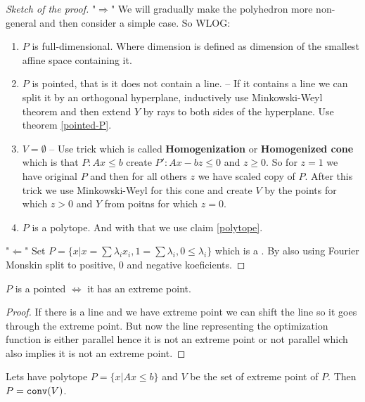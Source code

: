 \begin{proof}[Sketch of the proof]
	"$\Rightarrow$" We will gradually make the polyhedron more non-general and then consider a simple case. So WLOG:

	\begin{enumerate}
		\item $P$ is full-dimensional. Where dimension is defined as dimension of the smallest affine space containing it.
		\item $P$ is pointed, that is it does not contain a line. -- If it contains a line we can split it by an orthogonal hyperplane, inductively use Minkowski-Weyl theorem and then extend $Y$ by rays to both sides of the hyperplane. Use theorem \ref{pointed-P}.
		\item $V = \emptyset$ -- Use trick which is called \textbf{Homogenization} or \textbf{Homogenized cone} which is that $P : Ax \leq b$ create $P' : Ax - bz \leq 0$ and $z \geq 0$. So for $z = 1$ we have original $P$ and then for all others $z$ we have scaled copy of $P$. After this trick we use Minkowski-Weyl for this cone and create $V$ by the points for which $z > 0$ and $Y$ from poitns for which $z = 0$.
		\item $P$ is a polytope. And with that we use claim \ref{polytope}.
	\end{enumerate}

	"$\Leftarrow$" Set $P = \{x | x = \sum \lambda_{i} x_{i}, 1 = \sum \lambda_{i}, 0 \leq \lambda_{i}\}$ which is a . By also using Fourier Monskin split to positive, 0 and negative koeficients.
\end{proof}

\begin{thm}
	$P$ is a pointed $\iff$ it has an extreme point.
	\label{pointed-P}
\end{thm}

\begin{proof}
	If there is a line and we have extreme point we can shift the line so it goes through the extreme point. But now the line representing the optimization function is either parallel hence it is not an extreme point or not parallel which also implies it is not an extreme point.
\end{proof}

\begin{claim}
Lets have polytope $P = \{x | A x \leq b\}$ and $V$ be the set of extreme point of $P$. Then $P = \mathtt{conv}(V)$.
	\label{polytope}
\end{claim}

